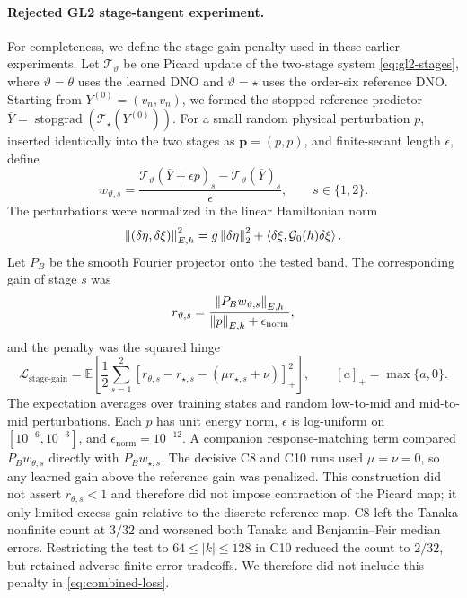 \paragraph{Rejected GL2 stage-tangent experiment.}
For completeness, we define the stage-gain penalty used in these earlier
experiments.  Let $\mathcal T_\vartheta$ be one Picard update of the two-stage
system \eqref{eq:gl2-stages}, where $\vartheta=\theta$ uses the learned DNO and
$\vartheta=\star$ uses the order-six reference DNO.  Starting from
$Y^{(0)}=(v_n,v_n)$, we formed the stopped reference predictor
$\overline Y=\operatorname{stopgrad}(\mathcal T_\star(Y^{(0)}))$.
For a small random physical perturbation $p$, inserted identically into the
two stages as $\boldsymbol p=(p,p)$, and finite-secant length $\epsilon$,
define
\begin{equation}
  w_{\vartheta,s}
  =
  \frac{
    \mathcal T_\vartheta(\overline Y+\epsilon p)_s
    -\mathcal T_\vartheta(\overline Y)_s
  }{\epsilon},
  \qquad s\in\{1,2\}.
  \label{eq:stage-secant}
\end{equation}
The perturbations were normalized in the linear Hamiltonian norm
\begin{equation}
  \left\lVert (\delta\eta,\delta\xi)\right\rVert_{E,h}^{2}
  =
  g\left\lVert \delta\eta\right\rVert_2^2
  +\left\langle \delta\xi,\mathcal{G}_0(h)\delta\xi\right\rangle.
  \label{eq:linear-energy-norm}
\end{equation}
Let $P_B$ be the smooth Fourier projector onto the tested band.  The
corresponding gain of stage $s$ was
\begin{equation}
  r_{\vartheta,s}
  =
  \frac{\left\lVert P_Bw_{\vartheta,s}\right\rVert_{E,h}}
       {\left\lVert p\right\rVert_{E,h}+\epsilon_{\mathrm{norm}}},
\end{equation}
and the penalty was the squared hinge
\begin{equation}
  \mathcal L_{\mathrm{stage\text{-}gain}}
  =
  \mathbb E\!\left[
    \frac12\sum_{s=1}^2
    \left[
      r_{\theta,s}-r_{\star,s}
      -\left(\mu r_{\star,s}+\nu\right)
    \right]_+^2
  \right],
  \qquad [a]_+=\max\{a,0\}.
  \label{eq:stage-gain-loss}
\end{equation}
The expectation averages over training states and random low-to-mid and
mid-to-mid perturbations.  Each $p$ has unit energy norm,
$\epsilon$ is log-uniform on $[10^{-6},10^{-3}]$, and
$\epsilon_{\mathrm{norm}}=10^{-12}$.  A companion response-matching term compared
$P_Bw_{\theta,s}$ directly with $P_Bw_{\star,s}$.  The decisive C8 and C10
runs used $\mu=\nu=0$, so any learned gain above the reference gain was
penalized.  This construction did not assert
$r_{\theta,s}<1$ and therefore did not impose contraction of the Picard map;
it only limited excess gain relative to the discrete reference map.  C8 left
the Tanaka nonfinite count at $3/32$ and worsened both Tanaka and
Benjamin--Feir median errors.  Restricting the test to $64\leq|k|\leq128$ in
C10 reduced the count to $2/32$, but retained adverse finite-error tradeoffs.
We therefore did not include this penalty in
\eqref{eq:combined-loss}.

